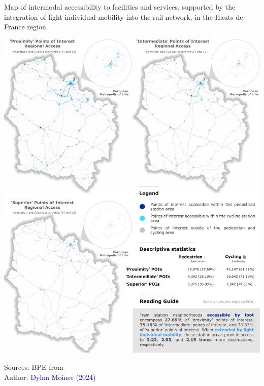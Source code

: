 \begin{refsegment}
\begin{carte}[h!]\vspace*{4pt}
    \caption{Map of intermodal accessibility to facilities and services, supported by the integration of light individual mobility into the rail network, in the Hauts-de-France region.}
    \label{fig-chap5:carte-accessibilite-poi}
    \centerline{\includegraphics[width=1\columnwidth]{src/Figures/Chap-5/EN_Distances_Carte_POI_compressed.pdf}}
    \vspace{5pt}
    \begin{flushright}\scriptsize{
    Sources: \acrfull{BPE} from \textcolor{blue}{\textcite{insee_base_2021}}
    \\
    Author: \textcolor{blue}{Dylan Moinse (2024)}
    }\end{flushright}
\end{carte}


\end{refsegment}
